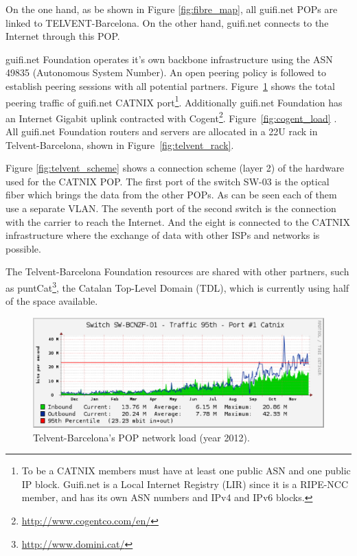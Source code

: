 On the one hand, as be shown in Figure \ref{fig:fibre_map}, all guifi.net POPs are linked to TELVENT-Barcelona. On the other hand, guifi.net connects to the Internet through this POP.

guifi.net Foundation operates it's own backbone infrastructure using the ASN 49835 (Autonomous System Number). 
An open peering policy is followed to establish peering sessions with all potential partners. Figure~\ref{fig:catnix_net_load} shows the total peering traffic of guifi.net CATNIX port\footnote{To be a CATNIX members must have at least one public ASN and one public IP block. Guifi.net is a Local Internet Registry (LIR) since it is a RIPE-NCC member, and has its own ASN numbers and IPv4 and IPv6 blocks.}. Additionally guifi.net Foundation has an Internet Gigabit uplink contracted with Cogent\footnote{\url{http://www.cogentco.com/en/}}. Figure~\ref{fig:cogent_load} . All guifi.net Foundation routers and servers are allocated in a 22U rack in Telvent-Barcelona, shown in Figure~\ref{fig:telvent_rack}. 


Figure \ref{fig:telvent_scheme} shows a connection scheme (layer 2) of the hardware used for the CATNIX POP. 
The first port of the switch SW-03 is the optical fiber which brings the data from the other POPs. As can be seen each
of them use a separate VLAN. The seventh port of the second switch is the connection with the carrier to reach the Internet.
And the eight is connected to the CATNIX infrastructure where the exchange of data with other ISPs and networks is possible. 


The Telvent-Barcelona Foundation resources are shared with other partners, such as puntCat\footnote{\url{http://www.domini.cat/}}, the Catalan Top-Level Domain (TDL), which is currently using half of the space available.

\begin{figure}[htbp]
  \centering
  \includegraphics[scale=.65]{pops/figures/catnix_network_load_year.eps} 
  \caption{Telvent-Barcelona's POP network load (year 2012).}
  \label{fig:catnix_net_load}
\end{figure}


